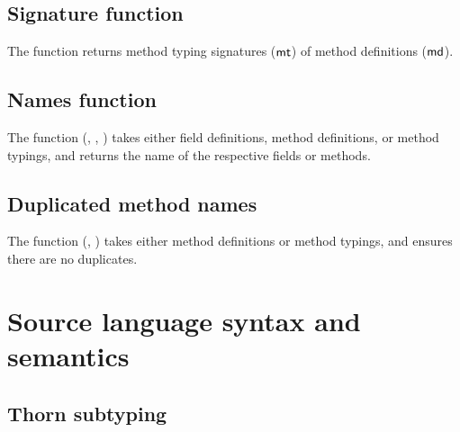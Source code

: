 \documentclass[acmlarge, anonymous, authordraft, review]{acmart} %
\begin{document}
\begin{mathpar}

\end{mathpar}

\subsection{Signature function}

The  function returns method typing signatures ($\mt$) of method definitions ($\md$).

\begin{mathpar}

\end{mathpar}

\subsection{Names function}

The  function (, , ) takes either field definitions, method definitions, or 
method typings, and returns the name of the respective fields or methods.

\subsection{Duplicated method names}

The  function (, ) takes either
method definitions or method typings, and ensures there are no duplicates.

\section{Source language syntax and semantics}

\subsection*{Thorn subtyping}
\end{document}
